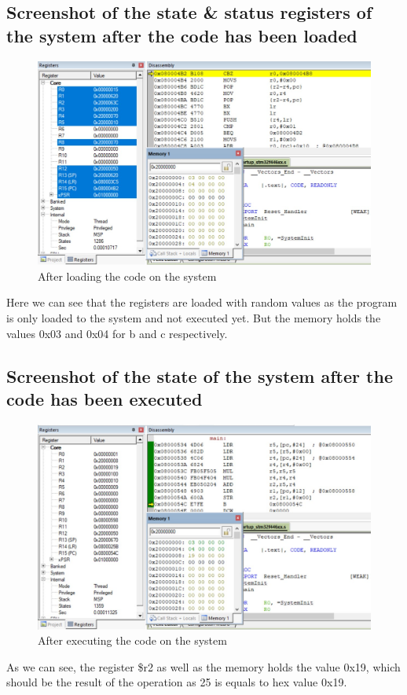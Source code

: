 \documentclass[footheight=20pt, footsepline, headheight=20pt, headsepline]{scrartcl}
\begin{document}
\subsection*{Screenshot of the state \& status registers of the system after the code has been loaded}
\begin{figure}[ht]
    \centering
    \includegraphics[scale=.7]{images/Task3b_Before1.jpg}
    \caption{After loading the code on the system}
    \label{fig:before_task_3b}
\end{figure}
\FloatBarrier
Here we can see that the registers are loaded with random values as the program is only loaded to the system and not executed yet. But the memory holds the values 0x03 and 0x04 for b and c respectively.
\subsection*{Screenshot of the state of the system after the code has been executed}
\begin{figure}[h!]
    \centering
    \includegraphics[scale=.7]{images/Task3b_After1.jpg}
    \caption{After executing the code on the system}
    \label{fig:after_task_3b}
\end{figure}
\FloatBarrier
As we can see, the register \$r2 as well as the memory holds the value 0x19, which should be the result of the operation as 25 is equals to hex value 0x19.
\end{document}
